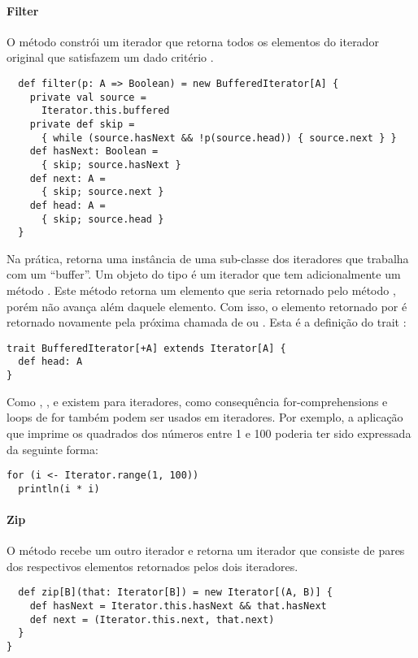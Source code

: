 \paragraph{Filter} O método  constrói um iterador que retorna
todos os elementos do iterador original que satisfazem um dado critério .
\begin{lstlisting}
  def filter(p: A => Boolean) = new BufferedIterator[A] {
    private val source =
      Iterator.this.buffered
    private def skip =
      { while (source.hasNext && !p(source.head)) { source.next } }
    def hasNext: Boolean =
      { skip; source.hasNext }
    def next: A =
      { skip; source.next }
    def head: A =
      { skip; source.head }
  }
\end{lstlisting}
Na prática,  retorna uma instância de uma sub-classe dos iteradores que trabalha com um
 ``buffer''.  Um objeto do tipo  é um iterador que tem adicionalmente um método
 . Este método retorna um elemento que seria retornado pelo método , porém
não avança além daquele elemento. Com isso, o elemento retornado por  é retornado novamente
pela próxima chamada de  ou . Esta é a definição do trait 
:
\begin{lstlisting}
trait BufferedIterator[+A] extends Iterator[A] {
  def head: A
}
\end{lstlisting}
Como , ,  e 
existem para iteradores, como consequência for-comprehensions e loops de for também podem ser usados em iteradores.
Por exemplo, a aplicação que imprime os quadrados dos números entre 1 e 100 poderia ter sido expressada da seguinte forma:
\begin{lstlisting}
for (i <- Iterator.range(1, 100))
  println(i * i)
\end{lstlisting}

\paragraph{Zip} O método  recebe um outro iterador e retorna um iterador que consiste
de pares dos respectivos elementos retornados pelos dois iteradores.
\begin{lstlisting}
  def zip[B](that: Iterator[B]) = new Iterator[(A, B)] {
    def hasNext = Iterator.this.hasNext && that.hasNext
    def next = (Iterator.this.next, that.next)
  }
}
\end{lstlisting}

